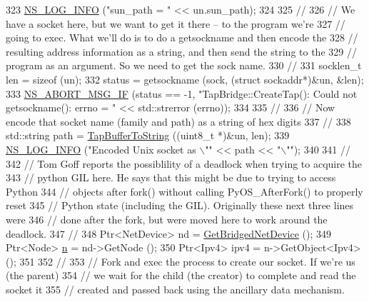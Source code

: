 \begin{DoxyCode}
323   \hyperlink{group__logging_gafbd73ee2cf9f26b319f49086d8e860fb}{NS\_LOG\_INFO} (\textcolor{stringliteral}{"sun\_path = "} << un.sun\_path);
324 
325   \textcolor{comment}{//}
326   \textcolor{comment}{// We have a socket here, but we want to get it there -- to the program we're}
327   \textcolor{comment}{// going to exec.  What we'll do is to do a getsockname and then encode the}
328   \textcolor{comment}{// resulting address information as a string, and then send the string to the}
329   \textcolor{comment}{// program as an argument.  So we need to get the sock name.}
330   \textcolor{comment}{//}
331   socklen\_t len = \textcolor{keyword}{sizeof} (un);
332   status = getsockname (sock, (\textcolor{keyword}{struct} sockaddr*)&un, &len);
333   \hyperlink{group__fatal_ga6653324225bc139e46deea177614ceee}{NS\_ABORT\_MSG\_IF} (status == -1, \textcolor{stringliteral}{"TapBridge::CreateTap(): Could not getsockname(): errno = "}
       << std::strerror (errno));
334 
335   \textcolor{comment}{//}
336   \textcolor{comment}{// Now encode that socket name (family and path) as a string of hex digits}
337   \textcolor{comment}{//}
338   std::string path = \hyperlink{namespacens3_abf9f661689b523b4b37b97879c1ffc12}{TapBufferToString} ((uint8\_t *)&un, len);
339   \hyperlink{group__logging_gafbd73ee2cf9f26b319f49086d8e860fb}{NS\_LOG\_INFO} (\textcolor{stringliteral}{"Encoded Unix socket as \(\backslash\)""} << path << \textcolor{stringliteral}{"\(\backslash\)""});
340 
341   \textcolor{comment}{//}
342   \textcolor{comment}{// Tom Goff reports the possiblility of a deadlock when trying to acquire the}
343   \textcolor{comment}{// python GIL here.  He says that this might be due to trying to access Python}
344   \textcolor{comment}{// objects after fork() without calling PyOS\_AfterFork() to properly reset }
345   \textcolor{comment}{// Python state (including the GIL).  Originally these next three lines were}
346   \textcolor{comment}{// done after the fork, but were moved here to work around the deadlock.}
347   \textcolor{comment}{//}
348   Ptr<NetDevice> nd = \hyperlink{classns3_1_1TapBridge_afc497fe420a336be2ff9076ab90cf713}{GetBridgedNetDevice} ();
349   Ptr<Node> \hyperlink{namespacesample-rng-plot_aeb5ee5c431e338ef39b7ac5431242e1d}{n} = nd->GetNode ();
350   Ptr<Ipv4> ipv4 = n->GetObject<Ipv4> ();
351 
352   \textcolor{comment}{//}
353   \textcolor{comment}{// Fork and exec the process to create our socket.  If we're us (the parent)}
354   \textcolor{comment}{// we wait for the child (the creator) to complete and read the socket it }
355   \textcolor{comment}{// created and passed back using the ancillary data mechanism.}

\end{DoxyCode}

